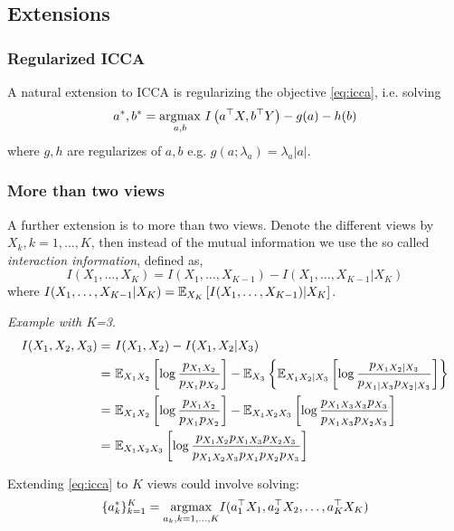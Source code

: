 \documentclass[12pt]{article}
\begin{document}
\subsection{Extensions}

\subsubsection{Regularized ICCA}

A natural extension to ICCA is regularizing the objective \eqref{eq:icca}, i.e. solving
\begin{equation}
a^\ast, b^\ast = \underset{a, b}{{\arg\!\max}}\ I \left(a^\top X, b^\top Y \right) - g(a) - h(b)
\end{equation}
where $g, h$ are regularizes of $a, b$ e.g. $g(a; \lambda_a) = \lambda_a |a|$.

\subsubsection{More than two views}

A further extension is to more than two views. Denote the different views by $X_k, k=1,\dots,K$, then instead of the mutual information we use the so called \textit{interaction information}, defined as,
\begin{equation}
    I(X_1, \dots, X_K) = I(X_1, \dots, X_{K-1}) - I(X_1, \dots, X_{K-1} | X_K)
\end{equation}
where $ I(X_1, \dots, X_{K-1} | X_K) = \mathbb{E}_{X_K} \left[ I(X_1, \dots, X_{K-1}) | X_K \right]$. 

\textit{Example with K=3.} 
\begin{align}
    I(X_1, X_2, X_3) =&\ I(X_1, X_2) - I(X_1, X_2 | X_3) \\
    = &\ \mathbb{E}_{X_1 X_2} \left[ \log \frac{p_{X_1 X_2}}{p_{X_1} p_{X_2}} \right] - 
    \mathbb{E}_{X_3} \left\{
	\mathbb{E}_{X_1 X_2| X_3} \left[
	    \log \frac{p_{X_1 X_2 | X_3}}{p_{X_1|X_3} p_{X_2|X_3}}
	\right]
    \right\} \\
    = &\ \mathbb{E}_{X_1 X_2} \left[ \log \frac{p_{X_1 X_2}}{p_{X_1} p_{X_2}} \right] - 
    \mathbb{E}_{X_1 X_2 X_3} \left[
	    \log \frac{p_{X_1 X_3 X_3} p_{X_3}}{p_{X_1 X_3} p_{X_2 X_3}}
    \right] \\
    = &\ \mathbb{E}_{X_1 X_2 X_3} \left[
	\log \frac{p_{X_1 X_2} p_{X_1 X_3} p_{X_2 X_3}}{p_{X_1 X_2 X_3} p_{X_1} p_{X_2} p_{X_3}}
    \right]
\end{align}

Extending \eqref{eq:icca} to $K$ views could involve solving:
\begin{equation}
    \{ a_k^\ast \}_{k=1}^K = \underset{a_k, k=1,\dots,K}{{\arg\!\max}} I(a_1^\top X_1, a_2^\top X_2, \dots, a_K^\top X_K)
\end{equation}
\end{document}
